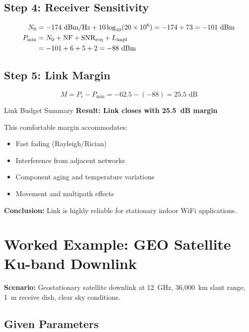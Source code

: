 \subsection*{Step 4: Receiver Sensitivity}

\begin{align}
N_0 &= -174\text{~dBm/Hz} + 10\log_{10}(20 \times 10^6) = -174 + 73 = -101\text{~dBm} \notag \\
P_{\text{min}} &= N_0 + \text{NF} + \text{SNR}_{\text{req}} + L_{\text{impl}} \notag \\
&= -101 + 6 + 5 + 2 = -88\text{~dBm}
\label{eq:ex1-sensitivity}
\end{align}

\subsection*{Step 5: Link Margin}

\begin{equation}
M = P_r - P_{\text{min}} = -62.5 - (-88) = 25.5\text{~dB}
\label{eq:ex1-margin}
\end{equation}

\begin{calloutbox}[colback=black!8!white,colframe=black]{Link Budget Summary}
\textbf{Result: Link closes with 25.5~dB margin}

This comfortable margin accommodates:
\begin{itemize}
\item Fast fading (Rayleigh/Rician)
\item Interference from adjacent networks
\item Component aging and temperature variations
\item Movement and multipath effects
\end{itemize}

\textbf{Conclusion:} Link is highly reliable for stationary indoor WiFi applications.
\end{calloutbox}

\section{Worked Example: GEO Satellite Ku-band Downlink}

\textbf{Scenario:} Geostationary satellite downlink at 12~GHz, 36,000~km slant range, 1~m receive dish, clear sky conditions.

\subsection*{Given Parameters}

